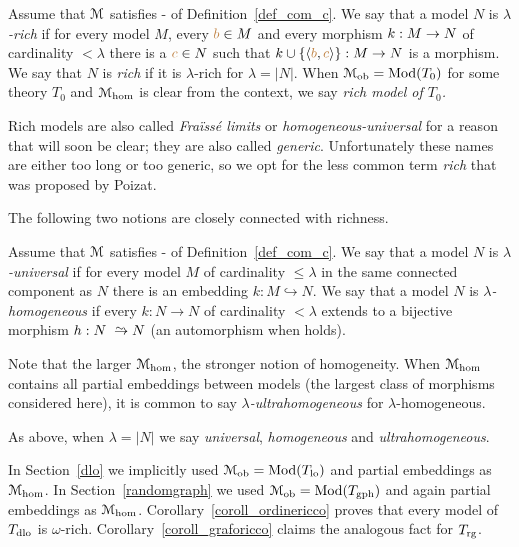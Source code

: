\begin{definition}\label{def_rich}
Assume that $\EuScript M$ satisfies - of Definition~\ref{def_com_c}.
We say that a model $N$ is \emph{$\lambda$-rich\/} if for every model $M$, every ${\color{brown} b}\in M$ and every morphism $k:M\rightarrow N$ of cardinality $<\lambda$ there is a ${\color{brown} c}\in N$ such that $k\cup\{\langle{\color{brown}b},{\color{brown} c}\rangle\}:M\to N$ is a morphism.
We say that $N$ is \emph{rich\/} if it is $\lambda$-rich for $\lambda=|N|$.
When $\EuScript M_{\rm ob}=\mathop{\rm Mod}(T_0)$ for some theory $T_0$ and $\EuScript M_{\rm hom}$ is clear from the context, we say \emph{rich model of $T_0$.}
\end{definition}

Rich models are also called \textit{Fra\"iss\'e limits} or \textit{homogeneous-universal\/} for a reason that will soon be clear; they are also called \textit{generic}.
Unfortunately these names are either too long or too generic, so we opt for the less common term \textit{rich\/} that was proposed by Poizat.

The following two notions are closely connected with richness.

\begin{definition}\label{def_omogenea_universale}
Assume that $\EuScript M$ satisfies - of Definition~\ref{def_com_c}.
We say that a model $N$ is \emph{$\lambda$-universal\/} if for every model $M$ of cardinality $\le\lambda$ in the same connected component as $N$ there is an embedding $k:M\hookrightarrow N$.
We say that a model $N$ is \emph{$\lambda$-homogeneous\/} if every $k:N\to N$ of cardinality $<\lambda$ extends to a bijective morphism $h:N\isomap N$ (an automorphism when  holds).

Note that the larger $\EuScript M_{\rm hom}$, the stronger notion of homogeneity.
When  $\EuScript M_{\rm hom}$ contains all partial embeddings between models (the largest class of morphisms considered here), it is common to say \emph{$\lambda$-ultra\-homo\-geneous\/} for $\lambda$-homogeneous.

As above, when $\lambda=|N|$ we say \emph{universal}, \emph{homogeneous} and \emph{ultrahomogeneous}.
\end{definition}

In Section~\ref{dlo} we implicitly used $\EuScript M_{\rm ob}=\mathop{\rm Mod}(T_{\rm lo})$ and partial embeddings as $\EuScript M_{\rm hom}$.
In Section~\ref{randomgraph} we used $\EuScript M_{\rm ob}=\mathop{\rm Mod}(T_{\rm gph})$ and again partial embeddings as $\EuScript M_{\rm hom}$.
Corollary~\ref{coroll_ordinericco} proves that every model of $T_{\rm dlo}$ is $\omega$-rich.
Corollary~\ref{coroll_graforicco} claims the analogous fact for $T_{\rm rg}$.

